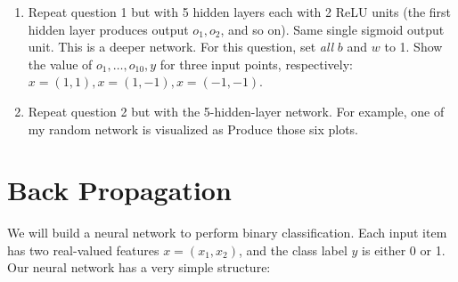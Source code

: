 \documentclass[a4paper]{article}
\theoremstyle{definition}
\begin{document}
\begin{enumerate}
\item Repeat question 1 but with 5 hidden layers each with 2 ReLU units (the first hidden layer produces output $o_1, o_2$, and so on).  Same single sigmoid output unit.  This is a deeper network.
For this question, set \emph{all} $b$ and $w$ to 1.
Show the value of $o_1, \ldots, o_{10}, y$ for three input points, respectively: $x=(1,1), x=(1, -1), x=(-1,-1)$.

\item Repeat question 2 but with the 5-hidden-layer network.
For example, one of my random network is visualized as
Produce those six plots.


\end{enumerate}

\section{Back Propagation}

We will build a neural network to perform binary classification.
Each input item has two real-valued features $x=(x_1, x_2)$, and the class label $y$ is either 0 or 1.
Our neural network has a very simple structure: 
\end{document}
